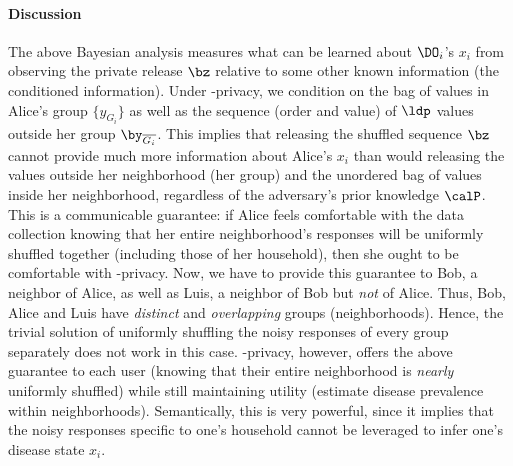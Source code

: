 \paragraph{Discussion}
The above Bayesian analysis measures what can be learned about $\DO_i$'s $x_i$ from observing the private release $\bz$ relative to some other known information (the conditioned information). 
Under \name-privacy, we condition on the bag of \ldp values in Alice's group $\{y_{G_i}\}$ as well as the sequence (order and value) of $\ldp$ values outside her group $\by_{\overline{G_i}}$. This implies that releasing the shuffled sequence $\bz$ cannot provide much more information about Alice's $x_i$ than would releasing the \ldp values outside her neighborhood (her group) and the unordered bag of \ldp values inside her neighborhood, regardless of the adversary's prior knowledge $\calP$. This is a communicable guarantee: if Alice feels comfortable with the data collection knowing that her entire neighborhood's responses will be uniformly shuffled together (including those of her household), then she ought to be comfortable with \name-privacy. Now, we have to provide this guarantee to Bob, a neighbor of Alice, as well as Luis, a neighbor of Bob but \textit{not} of Alice. Thus, Bob, Alice and Luis have \textit{distinct} and \textit{overlapping} groups (neighborhoods). Hence, the trivial solution of uniformly shuffling the noisy responses of every group separately does not work in this case. %
\name-privacy, however, offers the above guarantee to each user (knowing that their entire neighborhood is \textit{nearly} uniformly shuffled) while still maintaining utility (estimate disease prevalence within neighborhoods). Semantically, this is very powerful, since it implies that the noisy responses specific to one's household cannot be leveraged to infer one's disease state $x_i$. %

